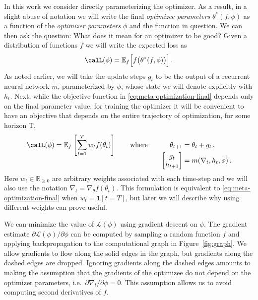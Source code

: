 \documentclass{article}
\begin{document}
In this work we consider directly parameterizing the optimizer. As a result, in
a slight abuse of notation we will write the final \emph{optimizee parameters}
$\theta^*(f, \phi)$ as a function of the \emph{optimizer parameters} $\phi$ and
the function in question. We can then ask the question: What does it mean for
an optimizer to be good? Given a distribution of functions $f$ we will write
the expected loss as
\begin{equation}
    \calL(\phi) =
    \mathbb{E}_{f} \Big[ f\big(\theta^*(f, \phi)\big) \Big] \,.
    \label{eq:meta-optimization-final}
\end{equation}
As noted earlier, we will take the update steps $g_t$ to be the output of a
recurrent neural network $m$, parameterized by $\phi$, whose
state we will denote explicitly with $h_t$. Next, while the objective function
in \eqref{eq:meta-optimization-final} depends only on the final parameter
value, for training the optimizer it will be convenient to have an objective
that depends on the entire trajectory of optimization, for some horizon T,
\begin{equation}
    \calL(\phi)
    = \mathbb{E}_{f} \left[\sum_{t=1}^T w_t f(\theta_t)\right]
    \qquad\text{where}\qquad
    \begin{aligned}[t]
        \theta_{t+1} &= \theta_t + g_t \,,
        \\
        \begin{bmatrix}
            g_t \\ h_{t+1}
        \end{bmatrix}
        &= m(\nabla_t, h_t, \phi) \,.
    \end{aligned}
    \label{eq:meta-optimization}
\end{equation}
Here $w_t \in \mathbb{R}_{\ge 0}$ are arbitrary weights associated with each
time-step and we will also use the notation $\nabla_t=\nabla_\theta
f(\theta_t)$. This formulation is equivalent to
\eqref{eq:meta-optimization-final} when $w_t = \boldsymbol{1}[t = T]$,
but later we will describe why using different weights can prove useful.

We can minimize the value of $\mathcal{L}(\phi)$ using gradient descent on
$\phi$. 
The gradient estimate
$\partial\mathcal{L(\phi)}/\partial\phi$ can be computed by sampling a random
function $f$ and applying backpropagation to the computational graph in
Figure~\ref{fig:graph}.  We allow gradients to flow along the solid edges in
the graph, but gradients along the dashed edges are dropped.  Ignoring
gradients along the dashed edges amounts to making the assumption that the
gradients of the optimizee do not depend on the optimizer parameters, i.e.\
$\partial \nabla_{t}\big/\partial\phi = 0$.
This assumption allows us to avoid computing second
derivatives of $f$.
\end{document}
